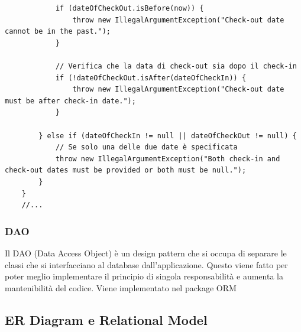 \documentclass[10pt]{article}
\begin{document}
\begin{lstlisting}
            if (dateOfCheckOut.isBefore(now)) {
                throw new IllegalArgumentException("Check-out date cannot be in the past.");
            }

            // Verifica che la data di check-out sia dopo il check-in
            if (!dateOfCheckOut.isAfter(dateOfCheckIn)) {
                throw new IllegalArgumentException("Check-out date must be after check-in date.");
            }

        } else if (dateOfCheckIn != null || dateOfCheckOut != null) {
            // Se solo una delle due date è specificata
            throw new IllegalArgumentException("Both check-in and check-out dates must be provided or both must be null.");
        }
    }
    //...
\end{lstlisting}
\par\medskip
\label{daosec}
\subsubsection{DAO}

Il DAO (Data Access Object) è un design pattern che si occupa di separare le classi che si interfacciano al database dall'applicazione. Questo viene fatto
per poter meglio implementare il principio di singola responsabilità e aumenta
la mantenibilità del codice. Viene implementato nel package ORM

\subsection{ER Diagram e Relational Model}
\end{document}
